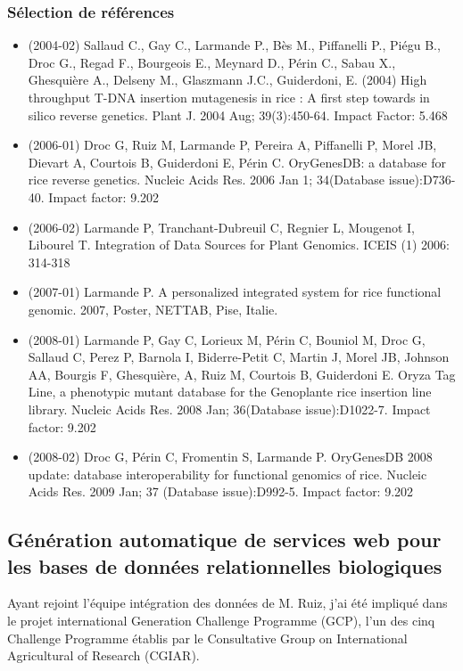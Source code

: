 \subsubsection*{Sélection de références}

\begin{itemize}

\item (2004-02) Sallaud C., Gay C., Larmande P., Bès M., Piffanelli P., Piégu B., Droc G., Regad F., Bourgeois E., Meynard D., Périn C., Sabau X., Ghesquière A., Delseny M., Glaszmann J.C., Guiderdoni, E. (2004) High throughput T-DNA insertion mutagenesis in rice : A first step towards in silico reverse genetics. Plant J. 2004 Aug; 39(3):450-64. Impact Factor: 5.468      
\item (2006-01) Droc G, Ruiz M, Larmande P, Pereira A, Piffanelli P, Morel JB, Dievart A, Courtois B, Guiderdoni E, Périn C. OryGenesDB: a database for rice reverse genetics. Nucleic Acids Res. 2006 Jan 1; 34(Database issue):D736-40. Impact factor: 9.202
\item (2006-02)  Larmande P, Tranchant-Dubreuil C, Regnier L, Mougenot I, Libourel T.
Integration of Data Sources for Plant Genomics. ICEIS (1) 2006: 314-318
\item (2007-01) Larmande P. A personalized integrated system for rice functional genomic. 2007, Poster, NETTAB, Pise, Italie.
\item (2008-01) Larmande P, Gay C, Lorieux M, Périn C, Bouniol M, Droc G, Sallaud C, Perez P, Barnola I, Biderre-Petit C, Martin J, Morel JB, Johnson AA, Bourgis F, Ghesquière, A, Ruiz M, Courtois B, Guiderdoni E. Oryza Tag Line, a phenotypic mutant database for the Genoplante rice insertion line library. Nucleic Acids Res. 2008 Jan; 36(Database issue):D1022-7. Impact factor: 9.202 
\item (2008-02) Droc G, Périn C, Fromentin S, Larmande P. OryGenesDB 2008 update: database interoperability for functional genomics of rice. Nucleic Acids Res. 2009 Jan; 37 (Database issue):D992-5. Impact factor: 9.202

\end{itemize}

\subsection*{Génération automatique de services web pour les bases de données relationnelles biologiques}
\label{SWS}

Ayant rejoint l’équipe intégration des données de M. Ruiz, j’ai été impliqué dans le projet international Generation Challenge Programme (GCP), l’un des cinq Challenge Programme établis par le Consultative Group on International Agricultural of Research (CGIAR).  \\

